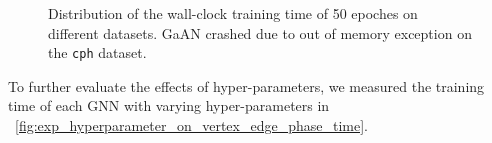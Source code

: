 \begin{figure}
    \caption{Distribution of the wall-clock training time of 50 epoches on different datasets. GaAN crashed due to out of memory exception on the \texttt{cph} dataset.}
    \label{fig:exp_absolute_training_time}
\end{figure}

To further evaluate the effects of hyper-parameters, we measured the training time of each GNN with varying hyper-parameters in \figurename~\ref{fig:exp_hyperparameter_on_vertex_edge_phase_time}.

